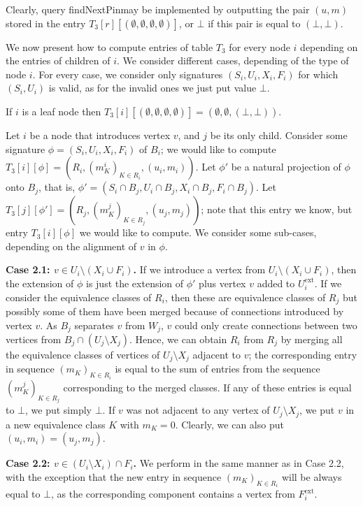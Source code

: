 \documentclass[a4paper,11pt]{article}
\theoremstyle{definition}
\theoremstyle{remark}
\newcommand{\qpin}{\textnormal{findNextPin}}
\newcommand{\ext}{\textrm{ext}}
\begin{document}
Clearly, query \qpin may be implemented by outputting the pair $(u,m)$
stored in the entry
$T_3[r][(\emptyset,\emptyset,\emptyset,\emptyset)]$, or $\bot$ if this
pair is equal to $(\bot,\bot)$.

We now present how to compute entries of table $T_3$ for every node
$i$ depending on the entries of children of $i$.  We consider
different cases, depending of the type of node $i$.  For every case,
we consider only signatures $(S_i,U_i,X_i,F_i)$ for which $(S_i,U_i)$
is valid, as for the invalid ones we just put value $\bot$. 

\vskip 0.3cm
 If $i$ is a leaf node then
$T_3[i][(\emptyset,\emptyset,\emptyset,\emptyset)]=(\emptyset,\emptyset,(\bot,\bot))$.  \vskip 0.3cm

 Let $i$ be a node that
introduces vertex $v$, and $j$ be its only child.  Consider some
signature $\phi=(S_i,U_i,X_i,F_i)$ of $B_i$; we would like to compute
$T_3[i][\phi]=(R_i,(m^i_K)_{K\in R_i},(u_i,m_i))$.  Let $\phi'$ be a
natural projection of $\phi$ onto $B_j$, that is, $\phi'=(S_i\cap B_j,
U_i\cap B_j, X_i\cap B_j, F_i\cap B_j)$.  Let
$T_3[j][\phi']=(R_j,(m^j_K)_{K\in R_j},(u_j,m_j))$; note that this
entry we know, but entry $T_3[i][\phi]$ we would like to compute.  We
consider some sub-cases, depending on the alignment of $v$ in $\phi$.

\vskip 0.1cm {\bf{Case 2.1: $v\in U_i\setminus (X_i\cup F_i)$.}} If we introduce a
vertex from $U_i\setminus (X_i\cup F_i)$, then the extension of $\phi$
is just the extension of $\phi'$ plus vertex $v$ added to
$U^{\ext}_i$.  If we consider the equivalence classes of $R_i$, then
these are equivalence classes of $R_j$ but possibly some of them have
been merged because of connections introduced by vertex $v$.  As $B_j$
separates $v$ from $W_j$, $v$ could only create connections between
two vertices from $B_j\cap (U_j\setminus X_j)$.  Hence, we can obtain
$R_i$ from $R_j$ by merging all the equivalence classes of vertices of
$U_j\setminus X_j$ adjacent to $v$; the corresponding entry in
sequence $(m_K)_{K\in R_i}$ is equal to the sum of entries from the
sequence $(m^j_K)_{K\in R_j}$ corresponding to the merged classes.  If
any of these entries is equal to $\bot$, we put simply $\bot$.  If $v$
was not adjacent to any vertex of $U_j\setminus X_j$, we put $v$ in a
new equivalence class $K$ with $m_K=0$.  Clearly, we can also put
$(u_i,m_i)=(u_j,m_j)$.

\vskip 0.1cm {\bf{Case 2.2: $v\in (U_i\setminus X_i)\cap F_i$.}} We perform in the
same manner as in Case 2.2, with the exception that the new entry in
sequence $(m_K)_{K\in R_i}$ will be always equal to $\bot$, as the
corresponding component contains a vertex from $F^{\ext}_i$.
\end{document}
